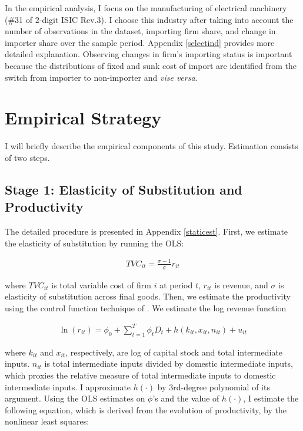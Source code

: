 \documentclass[11pt,letter]{article}
\begin{document}
In the empirical analysis, I focus on the manufacturing of electrical machinery (\#31 of 2-digit ISIC Rev.3). I choose this industry after taking into account the number of observations in the dataset, importing firm share, and change in importer share over the sample period. Appendix \ref{selectind} provides more detailed explanation. Observing changes in firm's importing status is important because the distributions of fixed and sunk cost of import are identified from the switch from importer to non-importer and \textit{vise versa}.


\section{Empirical Strategy}

I will briefly describe the empirical components of this study. Estimation consists of two steps. 
\subsection*{Stage 1: Elasticity of Substitution and Productivity}

The detailed procedure is presented in Appendix \ref{staticest}.
 First, we estimate the elasticity of substitution by running the OLS:

\begin{align*}
TVC_{it} = \frac{\sigma-1}{\sigma}r_{it}
\end{align*}

\noindent where $TVC_{it}$ is total variable cost of firm $i$ at period $t$, $r_{it}$ is revenue, and $\sigma$ is elasticity of substitution across final goods. Then, we estimate the productivity using the control function technique of \citet{Levinsohn2003}. We estimate the log revenue function 

\begin{align*}
\ln (r_{it})  = \phi_0 + \sum_{t=1}^T \phi_t D_t + h(k_{it},x_{it},n_{it}) + u_{it} 
\end{align*}

\noindent where $k_{it}$ and $x_{it}$, respectively, are log of capital stock and total intermediate inputs. $n_{it}$ is total intermediate inputs divided by domestic intermediate inputs, which proxies the relative measure of total intermediate inputs to domestic intermediate inputs. I approximate $h(\cdot)$ by 3rd-degree polynomial of its argument. Using the OLS estimates on $\phi$'s and the value of $h(\cdot)$, I estimate the following equation, which is derived from the evolution of productivity, by the nonlinear least squares:
\end{document}
